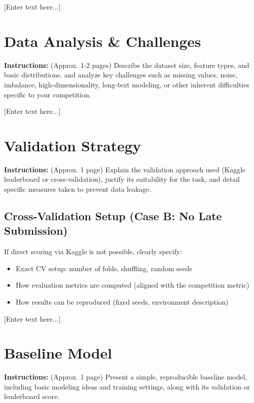 \documentclass[journal]{IEEEtran}
\begin{document}
[Enter text here...]

\section{Data Analysis \& Challenges}
\label{sec:data}
\textbf{Instructions:} (Approx. 1-2 pages)
Describe the dataset size, feature types, and basic distributions, and analyze key challenges such as missing values, noise, imbalance, high-dimensionality, long-text modeling, or other inherent difficulties specific to your competition.

[Enter text here...]

\section{Validation Strategy}
\label{sec:validation}
\textbf{Instructions:} (Approx. 1 page)
Explain the validation approach used (Kaggle leaderboard or cross-validation), justify its suitability for the task, and detail specific measures taken to prevent data leakage.

\subsection{Cross-Validation Setup (Case B: No Late Submission)}
If direct scoring via Kaggle is not possible, clearly specify:
\begin{itemize}
    \item Exact CV setup: number of folds, shuffling, random seeds
    \item How evaluation metrics are computed (aligned with the competition metric)
    \item How results can be reproduced (fixed seeds, environment description)
\end{itemize}

[Enter text here...]

\section{Baseline Model}
\label{sec:baseline}
\textbf{Instructions:} (Approx. 1 page)
Present a simple, reproducible baseline model, including basic modeling ideas and training settings, along with its validation or leaderboard score.
\end{document}

